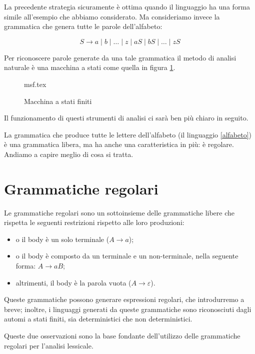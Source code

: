 \documentclass[class=book, crop=false, oneside, 12pt]{standalone}
\begin{document}
La precedente strategia sicuramente è ottima quando il linguaggio ha una forma simile all'esempio che abbiamo considerato. Ma consideriamo invece la grammatica che genera tutte le parole dell’alfabeto:

\begin{equation}
    \label{alfabeto}
    S \to a \mid b \mid … \mid z \mid aS \mid bS \mid … \mid zS
\end{equation}

Per riconoscere parole generate da una tale grammatica il metodo di analisi naturale è una macchina a stati come quella in figura \ref{macchina_a_stati_finiti}.

\begin{figure}[htb]
	\centering
	{msf.tex}
    \caption{Macchina a stati finiti}
	\label{macchina_a_stati_finiti}
\end{figure}

\noindent Il funzionamento di questi strumenti di analisi ci sarà ben più chiaro in seguito.

La grammatica che produce tutte le lettere dell’alfabeto (il linguaggio \ref{alfabeto}) è una grammatica libera, ma ha anche una caratteristica in più: è regolare. Andiamo a capire meglio di cosa si tratta.


\section{Grammatiche regolari}

Le grammatiche regolari sono un sottoinsieme delle grammatiche libere che rispetta le seguenti restrizioni rispetto alle loro produzioni:

\begin{itemize}
    \item o il body è un solo terminale (\(A \to a\));
    \item o il body è composto da un terminale e un non-terminale, nella seguente forma: \(A \to aB\);  
    \item altrimenti, il body è la parola vuota (\(A \to \varepsilon\)).
\end{itemize}

Queste grammatiche possono generare espressioni regolari, che introdurremo a breve; inoltre, i linguaggi generati da queste grammatiche sono riconosciuti dagli automi a stati finiti, sia deterministici che non deterministici.

Queste due osservazioni sono la base fondante dell'utilizzo delle grammatiche regolari per l’analisi lessicale.
\end{document}
